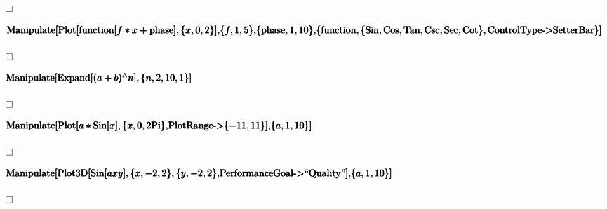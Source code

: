 \documentclass{article}
\begin{document}
\begin{doublespace}
\noindent\(\fbox{$$}\)
\end{doublespace}

\begin{doublespace}
\noindent\(\pmb{\text{Manipulate}[}\\
\pmb{\text{Plot}[\text{function}[f * x +\text{phase}],\{x,0,2\}],}\\
\pmb{\{f,1,5\},}\\
\pmb{\{\text{phase},1,10\},}\\
\pmb{\{\text{function},\{\text{Sin},\text{Cos},\text{Tan},\text{Csc},\text{Sec},\text{Cot}\},\text{ControlType}\text{-$>$}\text{SetterBar}\}]}\)
\end{doublespace}

\begin{doublespace}
\noindent\(\fbox{$$}\)
\end{doublespace}

\begin{doublespace}
\noindent\(\pmb{\text{Manipulate}[}\\
\pmb{\text{Expand}[(a+b){}^{\wedge}n],\{n,2,10,1\}]}\)
\end{doublespace}

\begin{doublespace}
\noindent\(\fbox{$$}\)
\end{doublespace}

\begin{doublespace}
\noindent\(\pmb{\text{Manipulate}[}\\
\pmb{\text{Plot}[a *\text{Sin}[x],\{x,0,2\text{Pi}\},}\\
\pmb{\text{PlotRange}\text{-$>$}\{-11,11\}],}\\
\pmb{\{a,1,10\}]}\)
\end{doublespace}

\begin{doublespace}
\noindent\(\fbox{$$}\)
\end{doublespace}

\begin{doublespace}
\noindent\(\pmb{\text{Manipulate}[}\\
\pmb{\text{Plot3D}[\text{Sin}[a x y],\{x,-2,2\},\{y,-2,2\},}\\
\pmb{\text{PerformanceGoal}\text{-$>$}\text{{``}Quality{''}}],}\\
\pmb{\{a,1,10\}]}\)
\end{doublespace}

\begin{doublespace}
\noindent\(\fbox{$$}\)
\end{doublespace}
\end{document}
